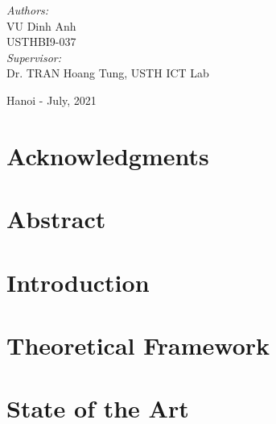 \documentclass[12pt, twoside]{book}
\begin{document}
\begin{center}
  \vspace*{0.5cm}
  { \large 
    \emph{Authors:} \\	
      {VU Dinh Anh} \\
      {USTHBI9-037} \\
    \vspace*{1.5cm}
    \emph{Supervisor:} \\													
      Dr. TRAN Hoang Tung, USTH ICT Lab \\
  }

  \begin{center}
    {Hanoi - July, 2021}
  \end{center}
  
\end{center}
																		


\frontmatter

\chapter{Acknowledgments}
\label{chap:acknowledgments}


\chapter{Abstract}
\label{chap:abstract}


\tableofcontents 

% 

\listoftables
\listoffigures


\mainmatter

\chapter{Introduction}
\label{chap:intro}


\chapter{Theoretical Framework}
\label{chap:theory}


\chapter{State of the Art}
\label{chap:state_of_art}

\end{document}
